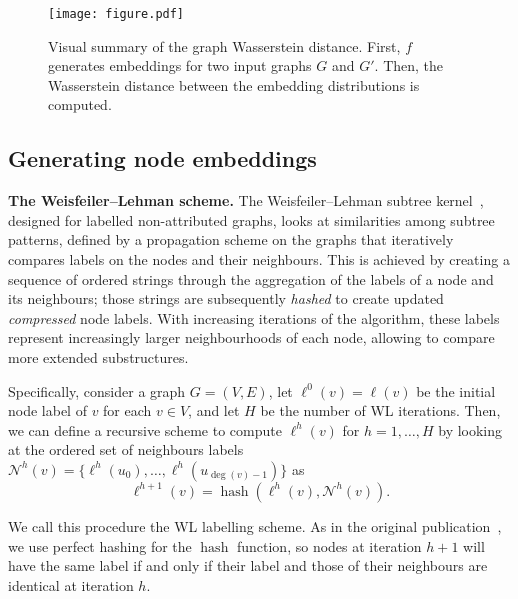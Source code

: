 \documentclass{article}
\DeclareMathOperator{\degree}{deg}
\DeclareMathOperator{\hash}{hash}
\begin{document}
\begin{figure*}[t]
\vskip 0.2in
  \centering
  \texttt{[image: figure.pdf]}
\caption{Visual summary of the graph Wasserstein distance. First, $f$ generates embeddings for two input graphs $G$ and $G'$. Then, the Wasserstein distance between the embedding distributions is computed.}
\label{fig:scheme}
\vskip -0.2in
\end{figure*}

\subsection{Generating node embeddings} \label{sec:NodeEmbeddings}


\textbf{The Weisfeiler--Lehman scheme.} The Weisfeiler--Lehman subtree kernel~\citep{shervashidze2009FastSK, shervashidze2011weisfeiler}, designed for labelled non-attributed graphs, looks at similarities among subtree patterns, defined by a propagation scheme on the graphs that iteratively compares labels on the nodes and their neighbours. This is achieved by creating a sequence of ordered strings through the aggregation of the labels of a node and its neighbours; those strings are subsequently \textit{hashed} to create updated \textit{compressed} node labels.
With increasing iterations of the algorithm, these labels represent increasingly larger neighbourhoods of each node, allowing to compare more extended substructures. 

Specifically, consider a graph $G = (V, E)$, let $\ell^0(v) = \ell(v)$ be the initial node label of $v$ for each $v\in V$, and let $H$ be the number of WL iterations. Then, we can define a recursive scheme to compute $\ell^{h}(v)$ for $h=1,\ldots, H$ by looking at the ordered set of neighbours labels $\mathcal{N}^{h}(v) = \{\ell^{h}(u_0),\ldots,\ell^{h}(u_{\degree(v)-1})\}$ as 
\begin{equation}
    \ell^{h+1}(v) = \hash(\ell^{h}(v), \mathcal{N}^h(v)).
\end{equation}

We call this procedure the WL labelling scheme. As in the original publication~\citep{shervashidze2009FastSK}, we use perfect hashing for the $\hash$ function, so nodes at iteration $h+1$ will have the same label if and only if their label and those of their neighbours are identical at iteration $h$. 
\end{document}
